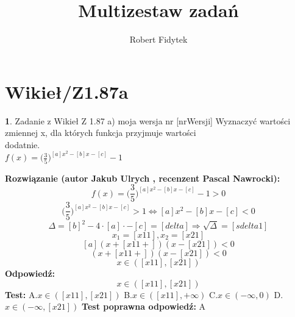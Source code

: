 \documentclass[12pt, a4paper]{article}
\title{Multizestaw zadań}
\author{Robert Fidytek}
\date{}
\theoremstyle{definition} %
\newtheorem{zad}{}
\newcommand{\kategoria}[1]{\section{#1}} %
\newcommand{\zadStart}[1]{\begin{zad}#1\newline} %
\newcommand{\zadStop}{\end{zad}}   %
\newcommand{\rozwStart}[2]{\noindent \textbf{Rozwiązanie (autor #1 , recenzent #2): }\newline} %
\newcommand{\rozwStop}{\newline}                                            %
\newcommand{\odpStart}{\noindent \textbf{Odpowiedź:}\newline}    %
\newcommand{\odpStop}{\newline}                                             %
\newcommand{\testStart}{\noindent \textbf{Test:}\newline} %
\newcommand{\testStop}{\newline} %
\newcommand{\kluczStart}{\noindent \textbf{Test poprawna odpowiedź:}\newline} %
\newcommand{\kluczStop}{\newline} %
\begin{document}
\maketitle


\kategoria{Wikieł/Z1.87a}
\zadStart{Zadanie z Wikieł Z 1.87 a) moja wersja nr [nrWersji]}
Wyznaczyć wartości zmiennej x, dla których funkcja przyjmuje wartości\\ dodatnie.\\ $f(x)=\big(\frac{3}{5}\big)^{[a]x^{2}-[b]x-[c]}-1$
\zadStop
\rozwStart{Jakub Ulrych}{Pascal Nawrocki}
$$f(x)=\big(\frac{3}{5}\big)^{[a]x^{2}-[b]x-[c]}-1>0$$
$$\big(\frac{3}{5}\big)^{[a]x^{2}-[b]x-[c]}>1\Leftrightarrow [a]x^{2}-[b]x-[c]<0$$
$$\Delta=[b]^{2}-4\cdot[a]\cdot-[c]=[delta]\Rightarrow \sqrt{\Delta}=[sdelta1]$$
$$x_{1}=[x11],x_{2}=[x21]$$
$$[a](x+[x11+])(x-[x21])<0$$
$$(x+[x11+])(x-[x21])<0$$
$$x\in([x11],[x21])$$
\rozwStop
\odpStart
$$x\in([x11],[x21])$$
\odpStop
\testStart
A.$x\in([x11],[x21])$
B.$x\in([x11],+\infty)$
C.$x\in(-\infty,0)$
D.$x\in(-\infty,[x21])$
\testStop
\kluczStart
A
\kluczStop
\end{document}
